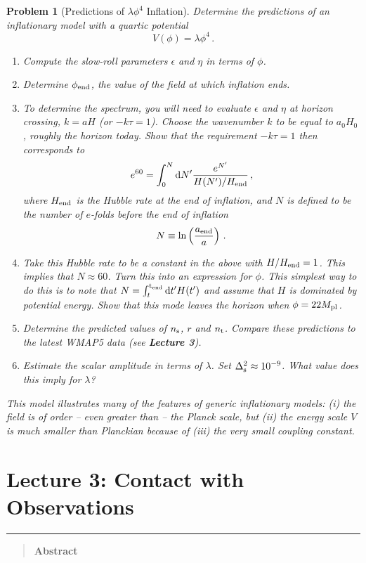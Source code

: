 \documentclass[12pt,letterpaper,rotate]{article}
\def\beq{\begin{equation}}
\def\eeq{\end{equation}}
\def\Mp{M_{\rm pl}}
\def\d{{\rm d}}
\newtheorem{thmP}{Problem}
\begin{document}
{\begin{thmP}[Predictions of $\lambda \phi^4$ Inflation]
Determine the predictions of an inflationary model with a quartic potential
\beq
V(\phi) = \lambda \phi^4\, .
\eeq
\begin{enumerate}
\item Compute the slow-roll parameters $\epsilon$ and $\eta$ in terms of $\phi$. 
\item Determine $\phi_{\rm end}$, the value of the field at which inflation ends.
\item To determine the spectrum, you will need to evaluate $\epsilon$ and $\eta$ at horizon crossing, $k=aH$ (or $-k \tau = 1$).
Choose the wavenumber $k$ to be equal to $a_0 H_0$, roughly the horizon today. Show that the requirement $-k\tau=1$ then corresponds to 
\beq
e^{60} = \int_0^N \d N' \frac{e^{N'}}{H(N')/H_{\rm end}}\, ,
\eeq
where $H_{\rm end}$ is the Hubble rate at the end of inflation, and $N$ is defined to be the number of $e$-folds before the end of inflation
\beq
N \equiv \ln \left( \frac{a_{\rm end}}{a}\right)\, .
\eeq
\item Take this Hubble rate to be a constant in the above with $H/H_{\rm end} =1$. This implies that $N\approx 60$. Turn this into an expression for $\phi$. This simplest way to do this is to note that $N = \int_t^{\rm t_{\rm end}} \d t' H(t')$ and assume that $H$ is dominated by potential energy. Show that this mode leaves the horizon when $\phi = 22 \Mp$.
\item Determine the predicted values of $n_{\rm s}$, $r$ and $n_{\rm t}$.
Compare these predictions to the latest WMAP5 data (see {\bf Lecture 3}).
\item Estimate the scalar amplitude in terms of $\lambda$. 
Set $\Delta_{\rm s}^2 \approx 10^{-9}$. What value does this imply for $\lambda$?
\end{enumerate}
This model illustrates many of the features of generic inflationary models: (i) the field is of order -- even greater than -- the Planck scale, but (ii) the energy scale $V$ is much smaller than Planckian because of (iii) the very small coupling constant.
\end{thmP}

\newpage
\part{Lecture 3: Contact with Observations}


\vspace{0.5cm}
 \hrule \vspace{0.3cm}
\begin{quote}
{\bf Abstract}


\end{quote}}
\end{document}
